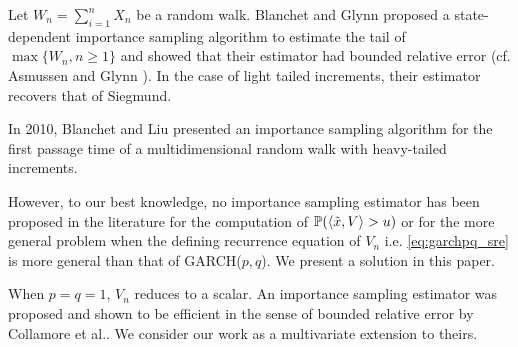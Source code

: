 Let $W_n = \sum_{i=1}^n X_n$ be a random walk. Blanchet and Glynn
\cite{blanchet:glynn:2008}
proposed a state-dependent importance sampling algorithm to estimate
the tail of $\max\{W_n, n \geq 1\}$ and showed that their estimator
had bounded relative error (cf. Asmussen and Glynn
\cite{opac-b1123521}). In the case of light tailed increments, their
estimator recovers that of Siegmund.

In 2010, Blanchet and Liu \cite{blanchet:liu:2010} presented an
importance sampling algorithm for the first passage time of a
multidimensional random walk with heavy-tailed increments.

However, to our best knowledge, no importance sampling
estimator has been proposed in the literature for the computation of
$\mathbb{P}(\langle\tilde x, V\rangle > u)$ or for the more general problem when the
defining recurrence equation of $V_n$ i.e. \eqref{eq:garchpq_sre} is 
more general than that of GARCH($p, q$). We present a solution in this
paper.

When $p = q = 1$, $V_n$ reduces to a scalar. An importance sampling
estimator was proposed and shown to be efficient in the sense of
bounded relative error by Collamore et al.\cite{collamore2014}. We
consider our work as a multivariate extension to theirs.

